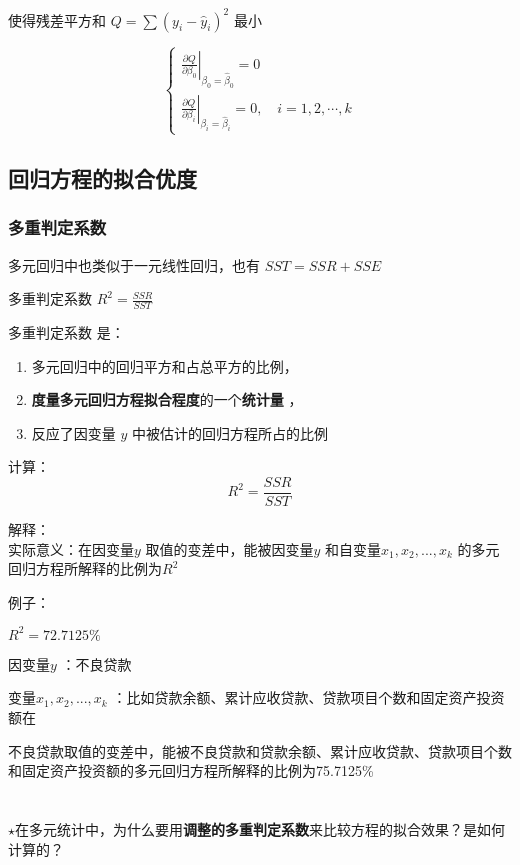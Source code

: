 \documentclass[UTF8,10pt]{book}
\begin{document}
{使得残差平方和 \(Q = \sum (y_i - \hat{y}_i)^2\) 最小

\[\left\{\begin{array}{l}
\left.\frac{\partial Q}{\partial \beta_{0}}\right|_{\beta_{0}=\hat{\beta}_{0}}=0 \\
\left.\frac{\partial Q}{\partial \beta_{i}}\right|_{\beta_{i}=\hat{\beta}_{i}}=0, \quad i=1,2, \cdots, k
\end{array}\right.\]

\subsection{回归方程的拟合优度}\label{header-n171}

\subsubsection{多重判定系数 }\label{header-n172}

多元回归中也类似于一元线性回归，也有 \( SST = SSR + SSE \)

多重判定系数 \(R^2 = \frac{SSR}{SST} \)

多重判定系数 是：

\begin{enumerate}
	\def\labelenumi{\arabic{enumi}.}
	\item
	多元回归中的回归平方和占总平方的比例，
	\item
	\textbf{度量多元回归方程拟合程度}的一个\textbf{统计量} ，
	\item
	反应了因变量 \(y\) 中被估计的回归方程所占的比例
\end{enumerate}

计算：\\
\[ R^2 = \frac{SSR}{SST} \]

解释：\\
实际意义：在因变量\(y\) 取值的变差中，能被因变量\(y\)
和自变量\(x_1,x_2,...,x_k\) 的多元回归方程所解释的比例为\(R^2\)

例子：

\(R^2=72.7125\% \)

因变量\(y\) ：不良贷款

变量\(x_1,x_2,...,x_k\)
：比如贷款余额、累计应收贷款、贷款项目个数和固定资产投资额在

不良贷款取值的变差中，能被不良贷款和贷款余额、累计应收贷款、贷款项目个数和固定资产投资额的多元回归方程所解释的比例为75.7125\%
\\
\\
\\
$\star$在多元统计中，为什么要用\textbf{调整的多重判定系数}来比较方程的拟合效果？是如何计算的？

}
\end{document}
